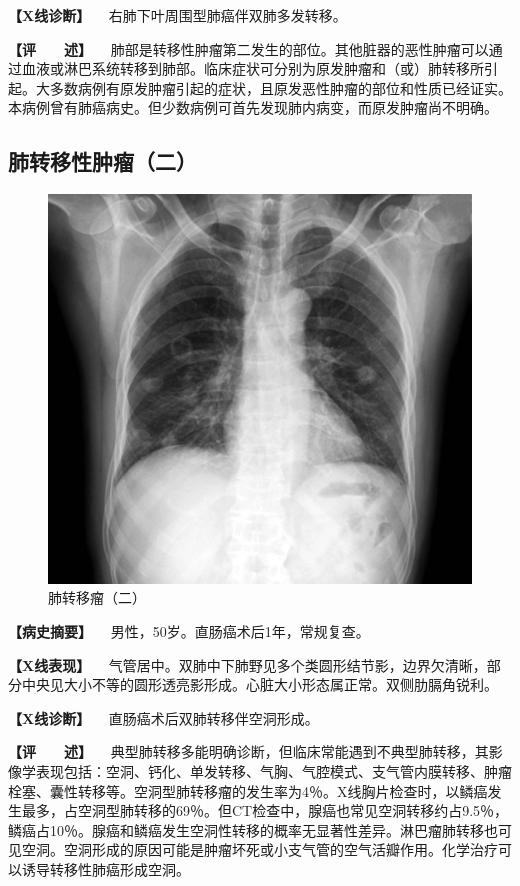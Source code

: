 \textbf{【X线诊断】} 　右肺下叶周围型肺癌伴双肺多发转移。

\textbf{【评　　述】}
　肺部是转移性肿瘤第二发生的部位。其他脏器的恶性肿瘤可以通过血液或淋巴系统转移到肺部。临床症状可分别为原发肿瘤和（或）肺转移所引起。大多数病例有原发肿瘤引起的症状，且原发恶性肿瘤的部位和性质已经证实。本病例曾有肺癌病史。但少数病例可首先发现肺内病变，而原发肿瘤尚不明确。

\subsection{肺转移性肿瘤（二）}

\begin{figure}[!htbp]
 \centering
 \includegraphics{./images/Image00176.jpg}
 \captionsetup{justification=centering}
 \caption{肺转移瘤（二）}
 \label{fig3-8-14}
  \end{figure} 

\textbf{【病史摘要】} 　男性，50岁。直肠癌术后1年，常规复查。

\textbf{【X线表现】}
　气管居中。双肺中下肺野见多个类圆形结节影，边界欠清晰，部分中央见大小不等的圆形透亮影形成。心脏大小形态属正常。双侧肋膈角锐利。

\textbf{【X线诊断】} 　直肠癌术后双肺转移伴空洞形成。

\textbf{【评　　述】}
　典型肺转移多能明确诊断，但临床常能遇到不典型肺转移，其影像学表现包括：空洞、钙化、单发转移、气胸、气腔模式、支气管内膜转移、肿瘤栓塞、囊性转移等。空洞型肺转移瘤的发生率为4％。X线胸片检查时，以鳞癌发生最多，占空洞型肺转移的69％。但CT检查中，腺癌也常见空洞转移约占9.5％，鳞癌占10％。腺癌和鳞癌发生空洞性转移的概率无显著性差异。淋巴瘤肺转移也可见空洞。空洞形成的原因可能是肿瘤坏死或小支气管的空气活瓣作用。化学治疗可以诱导转移性肺癌形成空洞。

